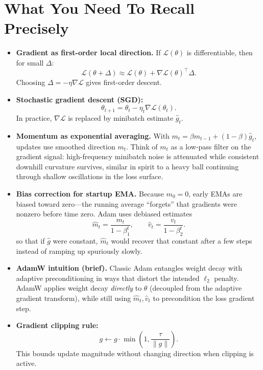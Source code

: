 \section*{What You Need To Recall Precisely}
\begin{itemize}[leftmargin=1.5em]
  \item \textbf{Gradient as first-order local direction.} If $\mathcal{L}(\theta)$ is differentiable, then for small $\Delta$:
  \[
    \mathcal{L}(\theta+\Delta)\approx \mathcal{L}(\theta) + \nabla \mathcal{L}(\theta)^\top \Delta.
  \]
  Choosing $\Delta=-\eta\nabla\mathcal{L}$ gives first-order descent.

  \item \textbf{Stochastic gradient descent (SGD):}
  \[
    \theta_{t+1}=\theta_t-\eta_t \nabla \mathcal{L}(\theta_t).
  \]
  In practice, $\nabla \mathcal{L}$ is replaced by minibatch estimate $\hat g_t$.

  \item \textbf{Momentum as exponential averaging.}  
  With $m_t=\beta m_{t-1} + (1-\beta)\hat g_t$, updates use smoothed direction $m_t$.
  Think of $m_t$ as a low-pass filter on the gradient signal: high-frequency minibatch noise is attenuated while consistent downhill curvature survives, similar in spirit to a heavy ball continuing through shallow oscillations in the loss surface.

  \item \textbf{Bias correction for startup EMA.}  
  Because $m_0=0$, early EMAs are biased toward zero---the running average ``forgets'' that gradients were nonzero before time zero. Adam uses debiased estimates
  \[
    \hat m_t=\frac{m_t}{1-\beta_1^t},\qquad \hat v_t=\frac{v_t}{1-\beta_2^t}.
  \]
  so that if $\hat g$ were constant, $\hat m_t$ would recover that constant after a few steps instead of ramping up spuriously slowly.

  \item \textbf{AdamW intuition (brief).}
  Classic Adam entangles weight decay with adaptive preconditioning in ways that distort the intended $\ell_2$ penalty. AdamW applies weight decay \emph{directly} to $\theta$ (decoupled from the adaptive gradient transform), while still using $\hat m_t,\hat v_t$ to precondition the loss gradient step.


  \item \textbf{Gradient clipping rule:}
  \[
    g \leftarrow g \cdot \min\left(1,\frac{\tau}{\|g\|}\right).
  \]
  This bounds update magnitude without changing direction when clipping is active.


\end{itemize}
